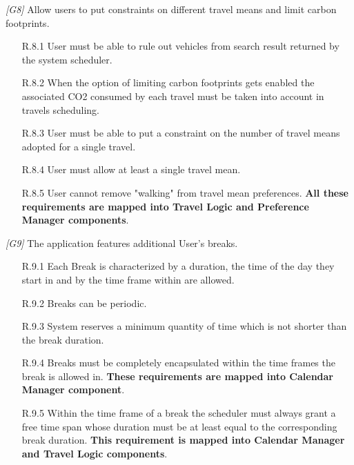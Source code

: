 \begin{description}
	\vskip0.75cm
	\item \textit{[G8]} Allow users to put constraints on different travel means and limit carbon footprints.
		\begin{itemize}
			\item[R.8.1] User must be able to rule out vehicles from search result returned by the system scheduler.

			\item[R.8.2] When the option of limiting carbon footprints gets enabled the associated CO2 consumed by each travel must be taken into account in travels scheduling.

			\item[R.8.3] User must be able to put a constraint on the number of travel means adopted for a single travel.

			\item[R.8.4] User must allow at least a single travel mean.

			\item[R.8.5] User cannot remove "walking" from travel mean preferences.		
			\textbf{All these requirements are mapped into Travel Logic and Preference Manager components}.
		\end{itemize}


	\vskip0.75cm
	\item \textit{[G9]} The application features additional User’s breaks.
		\begin{itemize}
			\item [R.9.1] Each Break is characterized by a duration, the time of the day they start in and by the time frame within are allowed.

			\item[R.9.2] Breaks can be periodic.

			\item[R.9.3] System reserves a minimum quantity of time which is not shorter than the break duration.

			\item[R.9.4] Breaks must be completely encapsulated within the time frames the break is allowed in.
			\textbf{These requirements are mapped into Calendar Manager component}.
			
			\item[R.9.5] Within the time frame of a break the scheduler must always grant a free time span whose duration must be at least equal to the corresponding break duration.
			\textbf{This requirement is mapped into Calendar Manager and Travel Logic components}.
		\end{itemize}



\end{description}
